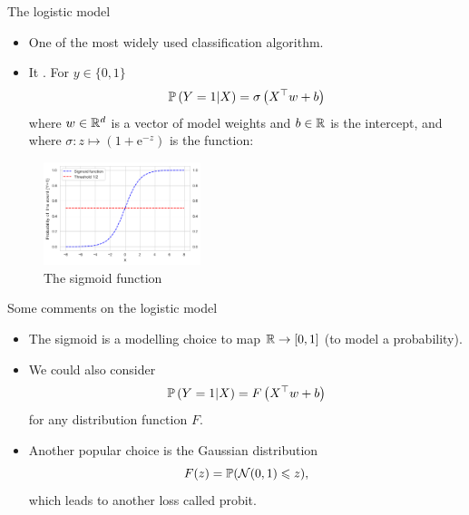 \documentclass[xcolor={usenames,dvipsnames},handout]{beamer}
\begin{document}
\begin{frame}{The logistic model}

\begin{itemize}
\item One of the most widely used classification algorithm.



\item It .
For $y\in \{0, 1\}$
$$
\P\left(  Y = 1 | X \right) = \sigma \left( X^\top w +b \right)
$$
where $w\in \R^d$ is a vector of model weights and $b\in\R$ is the
intercept, and where $\sigma:z \mapsto (1+ \mathrm{e}^{-z})$ is the  function:
\end{itemize}

\begin{figure}[H]
\begin{center}
\includegraphics[height=3cm]{./sigmoid}
\caption{The sigmoid function}
\end{center}
\end{figure}

\end{frame}



\begin{frame}{Some comments on the logistic model}
\begin{itemize}
\item The sigmoid is a modelling choice to map $\R \to [0, 1]$ (to model a probability).
\item We could also consider
$$
\P\left(  Y = 1 | X\right) = F \left( X^\top w +b \right)
$$
\alert{for any distribution function $F$}. 
\item Another popular choice is the
Gaussian distribution
$$ F(z) = \P(\Nc(0,1) \leq  z),
$$
which leads to another loss called {\color{PineGreen}probit}.
\end{itemize}
\end{frame}
\end{document}
